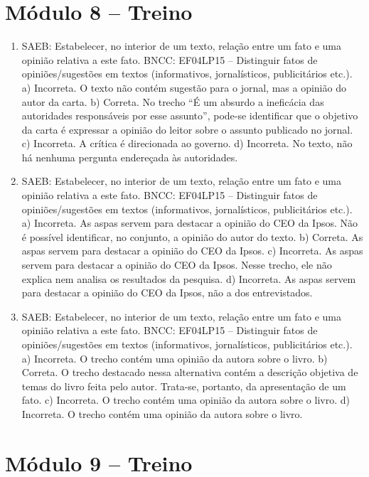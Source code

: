 \section*{Módulo 8 – Treino}

\begin{enumerate}
\item
SAEB: Estabelecer, no interior de um texto, relação entre um fato e
uma opinião relativa a este fato.
BNCC: EF04LP15 -- Distinguir fatos de opiniões/sugestões em textos
(informativos, jornalísticos, publicitários etc.).
a)  Incorreta. O texto não contém sugestão para o jornal, mas a
opinião do autor da carta.
b)  Correta. No trecho ``É um absurdo a ineficácia das autoridades
responsáveis por esse assunto'', pode-se identificar que o objetivo da
carta é expressar a opinião do leitor sobre o assunto publicado no jornal.
c)  Incorreta. A crítica é direcionada ao governo.
d)  Incorreta. No texto, não há nenhuma pergunta endereçada às autoridades.

\item
SAEB: Estabelecer, no interior de um texto, relação entre um fato e
uma opinião relativa a este fato.
BNCC: EF04LP15 -- Distinguir fatos de opiniões/sugestões em textos
(informativos, jornalísticos, publicitários etc.).
a) Incorreta. As aspas servem para destacar a opinião do CEO da Ipsos. 
Não é possível identificar, no conjunto, a opinião do autor do texto.  
b) Correta. As aspas servem para destacar a opinião do CEO da Ipsos.
c) Incorreta. As aspas servem para destacar a opinião do CEO da Ipsos.
Nesse trecho, ele não explica nem analisa os resultados da pesquisa.
d) Incorreta. As aspas servem para destacar a opinião do CEO da Ipsos, não
a dos entrevistados.

\item
SAEB: Estabelecer, no interior de um texto, relação entre um fato e
uma opinião relativa a este fato.
BNCC: EF04LP15 -- Distinguir fatos de opiniões/sugestões em textos
(informativos, jornalísticos, publicitários etc.).
a) Incorreta. O trecho contém uma opinião da autora sobre o livro.
b) Correta. O trecho destacado nessa alternativa contém a descrição
objetiva de temas do livro feita pelo autor. Trata-se, portanto, da apresentação de 
um fato. 
c) Incorreta. O trecho contém uma opinião da autora sobre o livro.
d) Incorreta. O trecho contém uma opinião da autora sobre o livro.
\end{enumerate}

\section*{Módulo 9 – Treino}

